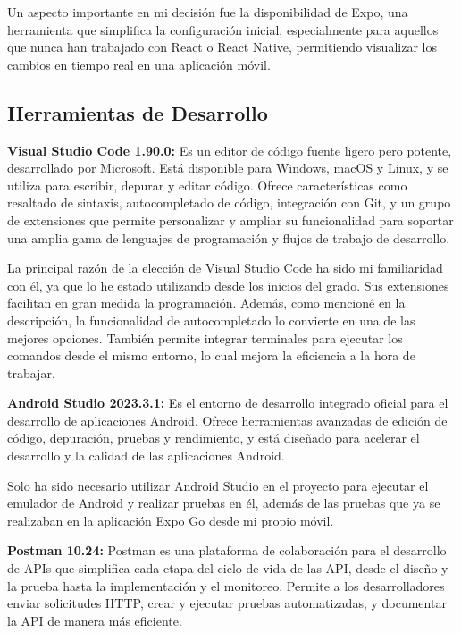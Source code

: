 Un aspecto importante en mi decisión fue la disponibilidad de Expo, una herramienta que simplifica la configuración inicial, especialmente para aquellos que nunca han trabajado con React o React Native, permitiendo visualizar los cambios en tiempo real en una aplicación móvil.

\subsection{Herramientas de Desarrollo}

\textbf{Visual Studio Code 1.90.0:} Es un editor de código fuente ligero pero potente, desarrollado por Microsoft. Está disponible para Windows, macOS y Linux, y se utiliza para escribir, depurar y editar código. Ofrece características como resaltado de sintaxis, autocompletado de código, integración con Git, y un grupo de extensiones que permite personalizar y ampliar su funcionalidad para soportar una amplia gama de lenguajes de programación y flujos de trabajo de desarrollo. \cite{vscode}

La principal razón de la elección de Visual Studio Code ha sido mi familiaridad con él, ya que lo he estado utilizando desde los inicios del grado. Sus extensiones facilitan en gran medida la programación. Además, como mencioné en la descripción, la funcionalidad de autocompletado lo convierte en una de las mejores opciones. También permite integrar terminales para ejecutar los comandos desde el mismo entorno, lo cual mejora la eficiencia a la hora de trabajar.

\textbf{Android Studio 2023.3.1:} Es el entorno de desarrollo integrado oficial para el desarrollo de aplicaciones Android. Ofrece herramientas avanzadas de edición de código, depuración, pruebas y rendimiento, y está diseñado para acelerar el desarrollo y la calidad de las aplicaciones Android. \cite{android}

Solo ha sido necesario utilizar Android Studio en el proyecto para ejecutar el emulador de Android y realizar pruebas en él, además de las pruebas que ya se realizaban en la aplicación Expo Go desde mi propio móvil.

\textbf{Postman 10.24:}  Postman es una plataforma de colaboración para el desarrollo de APIs que simplifica cada etapa del ciclo de vida de las API, desde el diseño y la prueba hasta la implementación y el monitoreo. Permite a los desarrolladores enviar solicitudes HTTP, crear y ejecutar pruebas automatizadas, y documentar la API de manera más eficiente. \cite{postman}

